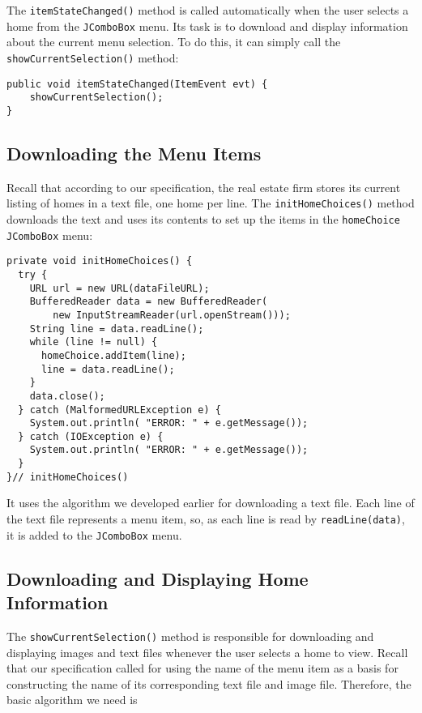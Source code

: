 {The {\tt itemStateChanged()} method is called automatically when the
user selects a home from the {\tt JComboBox} menu.  Its task is to
download and display information about the current menu selection.
To do this, it can simply call the {\tt showCurrentSelection()} method:

\begin{jjjlisting}
\begin{lstlisting}
public void itemStateChanged(ItemEvent evt) {
    showCurrentSelection();
}
\end{lstlisting}
\end{jjjlisting}


\subsection*{Downloading the Menu Items}
\noindent Recall that according to our specification, the real estate firm
stores its current listing of homes in a text file, one home per line.
The {\tt initHomeChoices()} method downloads the text and uses its
contents to set up the items in the {\tt homeChoice} {\tt JComboBox}
menu:

\begin{jjjlisting}
\begin{lstlisting}
private void initHomeChoices() {
  try {
    URL url = new URL(dataFileURL);
    BufferedReader data = new BufferedReader(
        new InputStreamReader(url.openStream()));
    String line = data.readLine();
    while (line != null) {
      homeChoice.addItem(line);
      line = data.readLine();
    }
    data.close();
  } catch (MalformedURLException e) {
    System.out.println( "ERROR: " + e.getMessage());
  } catch (IOException e) {
    System.out.println( "ERROR: " + e.getMessage());
  }
}// initHomeChoices()
\end{lstlisting}
\end{jjjlisting}

\noindent It uses the algorithm we developed earlier for downloading
a text file.  Each line of the text file represents a menu item, so, as
each line is read by {\tt readLine(data)}, it is added to the
{\tt JComboBox} menu.

\subsection*{Downloading and Displaying Home Information}
\noindent The {\tt showCurrentSelection()} method is responsible for downloading and
displaying images and text files whenever the user selects a home
to view.  Recall that our specification called for using the name of
the menu item as a basis for constructing the name of its corresponding
text file and image file.   Therefore, the basic algorithm we need is

}

